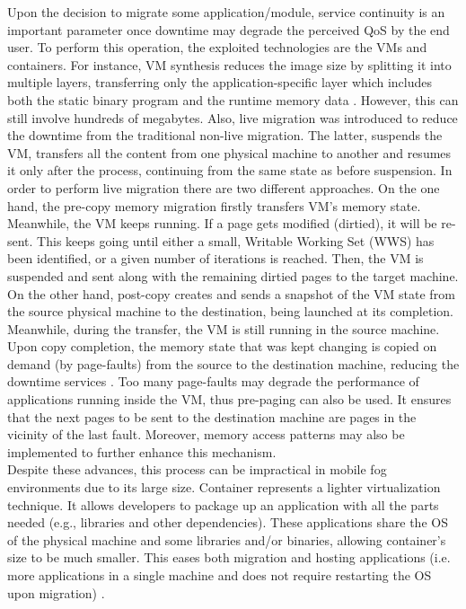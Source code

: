 \noindent\tab Upon the decision to migrate some application/module, service continuity is an important parameter once downtime may degrade the perceived QoS by the end user. To perform this operation, the exploited technologies are the VMs and containers. For instance, VM synthesis reduces the image size by splitting it into multiple layers, transferring only the application-specific layer which includes both the static binary program and the runtime memory data \cite{ma2017efficient}. However, this can still involve hundreds of megabytes. Also, live migration was introduced to reduce the downtime from the traditional non-live migration. The latter, suspends the VM, transfers all the content from one physical machine to another and resumes it only after the process, continuing from the same state as before suspension. In order to perform live migration there are two different approaches. On the one hand, the pre-copy memory migration firstly transfers VM’s memory state. Meanwhile, the VM keeps running. If a page gets modified (dirtied), it will be re-sent. This keeps going until either a small, Writable Working Set (WWS) has been identified, or a given number of iterations is reached. Then, the VM is suspended and sent along with the remaining dirtied pages to the target machine. On the other hand, post-copy creates and sends a snapshot of the VM state from the source physical machine to the destination, being launched at its completion. Meanwhile, during the transfer, the VM is still running in the source machine. Upon copy completion, the memory state that was kept changing is copied on demand (by page-faults) from the source to the destination machine, reducing the downtime services \cite{hines2009post}. Too many page-faults may degrade the performance of applications running inside the VM, thus pre-paging can also be used. It ensures that the next pages to be sent to the destination machine are pages in the vicinity of the last fault. Moreover, memory access patterns may also be implemented to further enhance this mechanism.\\
\noindent\tab Despite these advances, this process can be impractical in mobile fog environments due to its large size. Container represents a lighter virtualization technique. It allows developers to package up an application with all the parts needed (e.g., libraries and other dependencies). These applications share the OS of the physical machine and some libraries and/or binaries, allowing container's size to be much smaller. This eases both migration and hosting applications (i.e. more applications in a single machine and does not require restarting the OS upon migration) \cite{saurez2016incremental}.\\
